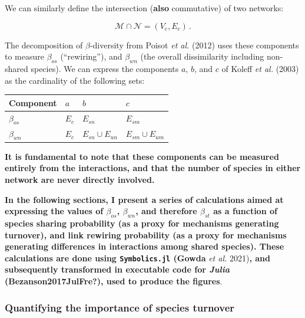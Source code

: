 \documentclass[11pt]{article}
\makeatletter
\def\maxwidth{\ifdim\Gin@nat@width>\linewidth\linewidth
\else\Gin@nat@width\fi}
\let\Oldincludegraphics\includegraphics
\renewcommand{\includegraphics}[1]{\Oldincludegraphics[width=\maxwidth]{#1}}
\providecommand{\DIFaddtex}[1]{{\bf #1}} %
\providecommand{\DIFdeltex}[1]{} %
\providecommand{\DIFaddbegin}{\protect\color{blue}} %
\providecommand{\DIFaddend}{\protect\color{black}} %
\providecommand{\DIFdelbegin}{\protect\color{red}} %
\providecommand{\DIFdelend}{\protect\color{black}} %
\providecommand{\DIFadd}[1]{\texorpdfstring{\DIFaddtex{#1}}{#1}} %
\providecommand{\DIFdel}[1]{\texorpdfstring{\DIFdeltex{#1}}{}} %
\newcommand{\DIFscaledelfig}{0.5}
\newlength{\DIFdelgraphicswidth} %
\newlength{\DIFdelgraphicsheight} %
\newcommand{\DIFaddincludegraphics}[2][]{{\color{blue}\fbox{\DIFOincludegraphics[#1]{#2}}}} %
\newcommand{\DIFdelincludegraphics}[2][]{%
\sbox{\DIFdelgraphicsbox}{\DIFOincludegraphics[#1]{#2}}%
\settoboxwidth{\DIFdelgraphicswidth}{\DIFdelgraphicsbox} %
\settoboxtotalheight{\DIFdelgraphicsheight}{\DIFdelgraphicsbox} %
\scalebox{\DIFscaledelfig}{%
\parbox[b]{\DIFdelgraphicswidth}{\usebox{\DIFdelgraphicsbox}\\[-\baselineskip] \rule{\DIFdelgraphicswidth}{0em}}\llap{\resizebox{\DIFdelgraphicswidth}{\DIFdelgraphicsheight}{%
\setlength{\unitlength}{\DIFdelgraphicswidth}%
\begin{picture}(1,1)%
\thicklines\linethickness{2pt} %
{\color[rgb]{1,0,0}\put(0,0){\framebox(1,1){}}}%
{\color[rgb]{1,0,0}\put(0,0){\line( 1,1){1}}}%
{\color[rgb]{1,0,0}\put(0,1){\line(1,-1){1}}}%
\end{picture}%
}\hspace*{3pt}}} %
} %
\DeclareRobustCommand{\DIFaddbegin}{\DIFOaddbegin \let\includegraphics\DIFaddincludegraphics} %
\DeclareRobustCommand{\DIFaddend}{\DIFOaddend \let\includegraphics\DIFOincludegraphics} %
\DeclareRobustCommand{\DIFdelbegin}{\DIFOdelbegin \let\includegraphics\DIFdelincludegraphics} %
\DeclareRobustCommand{\DIFdelend}{\DIFOaddend \let\includegraphics\DIFOincludegraphics} %
\makeatother
\begin{document}
We can similarly define the intersection (\DIFdelbegin \DIFdel{similarly }\DIFdelend \DIFaddbegin \DIFadd{also }\DIFaddend commutative) of two
networks:

\[\mathcal{M} \cap \mathcal{N} = (V_c, E_c)\,.\]

The decomposition of \(\beta\)-diversity from Poisot \emph{et al.}
(2012) uses these components to measure \(\beta_{os}\) (\DIFdelbegin \DIFdel{the interaction
dissimilarity between shared species, which Fründ (2021) terms
}\DIFdelend ``rewiring''),
and \(\beta_{wn}\) (the overall dissimilarity including non-shared
species). We can express the components \(a\), \(b\), and \(c\) of
Koleff \emph{et al.} (2003) as the cardinality of the following sets:

\begin{longtable}[]{@{}llll@{}}
\toprule
Component & \(a\) & \(b\) & \(c\)\tabularnewline
\midrule
\endhead
\(\beta_{os}\) & \(E_c\) & \(E_{sn}\) & \(E_{sm}\)\tabularnewline
\(\beta_{wn}\) & \(E_c\) & \(E_{sn} \cup E_{un}\) &
\(E_{sm} \cup E_{um}\)\tabularnewline
\bottomrule
\end{longtable}

\DIFdelbegin \DIFdel{These decompositions are used to perform the calculations of \(\beta\)-diversity in the \texttt{EcologicalNetworks.jl} package
(Banville }\DIFdelend \DIFaddbegin \DIFadd{It is fundamental to note that these components can be measured entirely
from the interactions, and that the number of species in either network
are never directly involved.
}

\DIFadd{In the following sections, I present a series of calculations aimed at
expressing the values of \(\beta_{os}\), \(\beta_{wn}\), and therefore
\(\beta_{st}\) as a function of species sharing probability (as a proxy
for mechanisms generating turnover), and link rewiring probability (as a
proxy for mechanisms generating differences in interactions among shared
species). These calculations are done using \texttt{Symbolics.jl} (Gowda
}\DIFaddend \emph{et al.} 2021)\DIFdelbegin \DIFdel{for Julia, which I use for
the following
numerical experiments}\DIFdelend \DIFaddbegin \DIFadd{, and subsequently transformed in executable code for
\emph{Julia} (\textbf{Bezanson2017JulFre?}), used to produce the
figures}\DIFaddend .

\DIFdelbegin %
\DIFdelend \DIFaddbegin \hypertarget{quantifying-the-importance-of-species-turnover}{%
\subsubsection{Quantifying the importance of species
turnover}\label{quantifying-the-importance-of-species-turnover}}
\DIFaddend 
\end{document}
